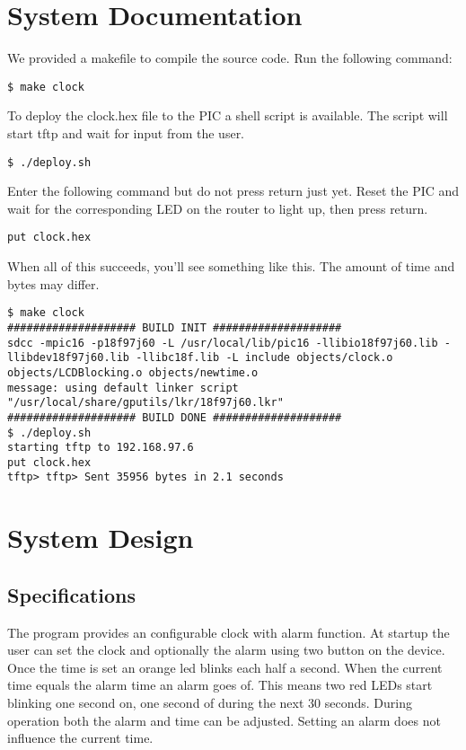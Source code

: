 \documentclass[11pt]{article}
\begin{document}
\section{System Documentation}
We provided a makefile to compile the source code. Run the following command:
\begin{lstlisting}
$ make clock 
\end{lstlisting}
To deploy the clock.hex file to the PIC a shell script is available. The script will start tftp and wait for input from the user. 
\begin{lstlisting}
$ ./deploy.sh 
\end{lstlisting}
Enter the following command but do not press return just yet. Reset the PIC and wait for the corresponding LED on the router to light up, then press return.
\begin{lstlisting}
put clock.hex
\end{lstlisting}
When all of this succeeds, you'll see something like this. The amount of time and bytes may differ.
\begin{lstlisting}
$ make clock 
#################### BUILD INIT ####################
sdcc -mpic16 -p18f97j60 -L /usr/local/lib/pic16 -llibio18f97j60.lib -llibdev18f97j60.lib -llibc18f.lib -L include objects/clock.o objects/LCDBlocking.o objects/newtime.o
message: using default linker script "/usr/local/share/gputils/lkr/18f97j60.lkr"
#################### BUILD DONE ####################
$ ./deploy.sh 
starting tftp to 192.168.97.6
put clock.hex
tftp> tftp> Sent 35956 bytes in 2.1 seconds
\end{lstlisting}

\section{System Design}

\subsection{Specifications}
The program provides an configurable clock with alarm function. At startup the user can set the clock and optionally the alarm using two button on the device. Once the time is set an orange led blinks each half a second. When the current time equals the alarm time an alarm goes of. This means two red LEDs start blinking one second on, one second of during the next 30 seconds. During operation both the alarm and time can be adjusted. Setting an alarm does not influence the current time.
\end{document}
